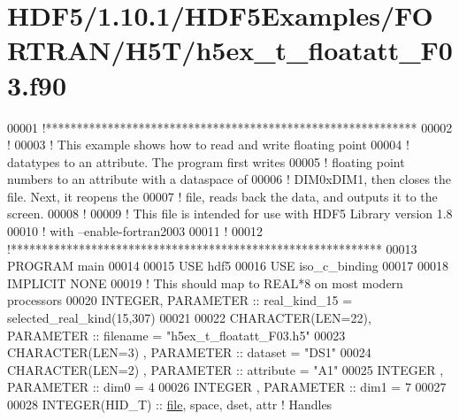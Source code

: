 \hypertarget{_h_d_f5_21_810_81_2_h_d_f5_examples_2_f_o_r_t_r_a_n_2_h5_t_2h5ex__t__floatatt___f03_8f90_source}{}\section{H\+D\+F5/1.10.1/\+H\+D\+F5\+Examples/\+F\+O\+R\+T\+R\+A\+N/\+H5\+T/h5ex\+\_\+t\+\_\+floatatt\+\_\+\+F03.f90}
\label{_h_d_f5_21_810_81_2_h_d_f5_examples_2_f_o_r_t_r_a_n_2_h5_t_2h5ex__t__floatatt___f03_8f90_source}

\begin{DoxyCode}
00001 \textcolor{comment}{!************************************************************}
00002 \textcolor{comment}{!}
00003 \textcolor{comment}{!  This example shows how to read and write floating point}
00004 \textcolor{comment}{!  datatypes to an attribute.  The program first writes}
00005 \textcolor{comment}{!  floating point numbers to an attribute with a dataspace of}
00006 \textcolor{comment}{!  DIM0xDIM1, then closes the file.  Next, it reopens the}
00007 \textcolor{comment}{!  file, reads back the data, and outputs it to the screen.}
00008 \textcolor{comment}{!}
00009 \textcolor{comment}{!  This file is intended for use with HDF5 Library version 1.8}
00010 \textcolor{comment}{!  with --enable-fortran2003}
00011 \textcolor{comment}{!}
00012 \textcolor{comment}{!************************************************************}
00013 \textcolor{keyword}{PROGRAM} main
00014 
00015   \textcolor{keywordtype}{USE }hdf5
00016   \textcolor{keywordtype}{USE }iso\_c\_binding
00017 
00018   \textcolor{keywordtype}{IMPLICIT NONE}
00019   \textcolor{comment}{! This should map to REAL*8 on most modern processors}
00020   \textcolor{keywordtype}{INTEGER}, \textcolor{keywordtype}{PARAMETER} :: real\_kind\_15 = selected\_real\_kind(15,307)
00021 
00022   \textcolor{keywordtype}{CHARACTER(LEN=22)}, \textcolor{keywordtype}{PARAMETER} :: filename  = \textcolor{stringliteral}{"h5ex\_t\_floatatt\_F03.h5"}
00023   \textcolor{keywordtype}{CHARACTER(LEN=3)} , \textcolor{keywordtype}{PARAMETER} :: dataset   = \textcolor{stringliteral}{"DS1"}
00024   \textcolor{keywordtype}{CHARACTER(LEN=2)} , \textcolor{keywordtype}{PARAMETER} :: attribute = \textcolor{stringliteral}{"A1"}
00025   \textcolor{keywordtype}{INTEGER}          , \textcolor{keywordtype}{PARAMETER} :: dim0      = 4
00026   \textcolor{keywordtype}{INTEGER}          , \textcolor{keywordtype}{PARAMETER} :: dim1      = 7
00027 
00028   \textcolor{keywordtype}{INTEGER(HID\_T)}  :: \hyperlink{structfile}{file}, space, dset, attr \textcolor{comment}{! Handles}

\end{DoxyCode}
